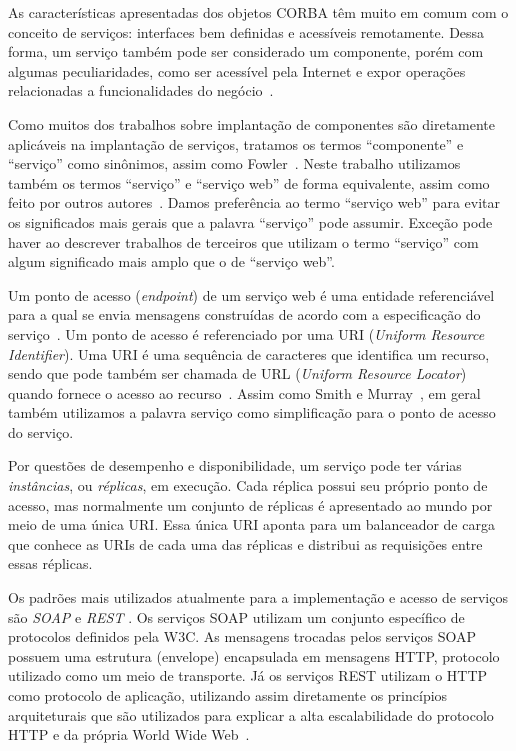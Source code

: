 As características apresentadas dos objetos CORBA têm muito em comum com o conceito de serviços: 
interfaces bem definidas e acessíveis remotamente.
Dessa forma, um serviço também pode ser considerado um componente, porém com algumas peculiaridades, 
como ser acessível pela Internet e expor operações relacionadas a funcionalidades do negócio~\cite{Hewitt2009JavaSOA}.

Como muitos dos trabalhos sobre implantação de componentes são diretamente aplicáveis na implantação de serviços, tratamos os termos ``componente'' e ``serviço'' como sinônimos, assim como Fowler~\cite{Fowler2004Inversion}. Neste trabalho utilizamos também os termos ``serviço'' e ``serviço web'' de forma equivalente, assim como feito por outros autores~\cite{Watson2006Dynasoar}. Damos preferência ao termo ``serviço web'' para evitar os significados mais gerais que a palavra ``serviço'' pode assumir. Exceção pode haver ao descrever trabalhos de terceiros que utilizam o termo ``serviço'' com algum significado mais amplo que o de ``serviço web''. 

Um ponto de acesso (\textit{endpoint}) de um serviço web é uma entidade referenciável para a qual se envia mensagens construídas de acordo com a especificação do serviço~\cite{W3C2004Addressing}. 
Um ponto de acesso é referenciado por uma URI (\emph{Uniform Resource Identifier}).
Uma URI é uma sequência de caracteres que identifica um recurso, sendo que pode também ser chamada de URL (\emph{Uniform Resource Locator}) quando fornece o acesso ao recurso~\cite{rfc3986}.
Assim como Smith e Murray~\cite{Smith2010Evolution}, em geral também utilizamos a palavra serviço como simplificação para o ponto de acesso do serviço. 

Por questões de desempenho e disponibilidade, um serviço pode ter várias \emph{instâncias}, ou \emph{réplicas},
em execução. Cada réplica possui seu próprio ponto de acesso, mas normalmente um conjunto de réplicas é apresentado
ao mundo por meio de uma única URI. Essa única URI aponta para um balanceador de carga que conhece
as URIs de cada uma das réplicas e distribui as requisições entre essas réplicas.

Os padrões mais utilizados atualmente para a implementação e acesso de serviços são \emph{SOAP} e \emph{REST} . Os serviços SOAP utilizam um conjunto específico de protocolos definidos pela W3C. As mensagens trocadas pelos serviços SOAP possuem uma estrutura (envelope) encapsulada em mensagens HTTP, protocolo utilizado como um meio de transporte. Já os serviços REST utilizam o HTTP como protocolo de aplicação, utilizando assim diretamente os princípios arquiteturais que são utilizados para explicar a alta escalabilidade do protocolo HTTP e da própria World Wide Web~\cite{Pautasso2008Restful}. 

